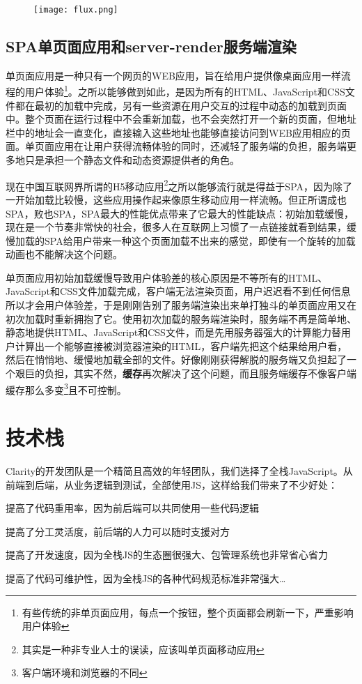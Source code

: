 \begin{figure}[!htp]
 \centering
 \texttt{[image: flux.png]}
\end{figure}

\subsection{SPA单页面应用和server-render服务端渲染}
单页面应用是一种只有一个网页的WEB应用，旨在给用户提供像桌面应用一样流程的用户体验\footnote{有些传统的非单页面应用，每点一个按钮，整个页面都会刷新一下，严重影响用户体验}。之所以能够做到如此，是因为所有的HTML、JavaScript和CSS文件都在最初的加载中完成，另有一些资源在用户交互的过程中动态的加载到页面中。整个页面在运行过程中不会重新加载，也不会突然打开一个新的页面，但地址栏中的地址会一直变化，直接输入这些地址也能够直接访问到WEB应用相应的页面。单页面应用在让用户获得流畅体验的同时，还减轻了服务端的负担，服务端更多地只是承担一个静态文件和动态资源提供者的角色。

现在中国互联网界所谓的H5移动应用\footnote{其实是一种非专业人士的误读，应该叫单页面移动应用}之所以能够流行就是得益于SPA，因为除了一开始加载比较慢，这些应用操作起来像原生移动应用一样流畅。但正所谓成也SPA，败也SPA，SPA最大的性能优点带来了它最大的性能缺点：初始加载缓慢，现在是一个节奏非常快的社会，很多人在互联网上习惯了一点链接就看到结果，缓慢加载的SPA给用户带来一种这个页面加载不出来的感觉，即使有一个旋转的加载动画也不能解决这个问题。

单页面应用初始加载缓慢导致用户体验差的核心原因是不等所有的HTML、JavaScript和CSS文件加载完成，客户端无法渲染页面，用户迟迟看不到任何信息所以才会用户体验差，于是刚刚告别了服务端渲染出来单打独斗的单页面应用又在初次加载时重新拥抱了它。使用初次加载的服务端渲染时，服务端不再是简单地、静态地提供HTML、JavaScript和CSS文件，而是先用服务器强大的计算能力替用户计算出一个能够直接被浏览器渲染的HTML，客户端先把这个结果给用户看，然后在悄悄地、缓慢地加载全部的文件。好像刚刚获得解脱的服务端又负担起了一个艰巨的负担，其实不然，\textbf{缓存}再次解决了这个问题，而且服务端缓存不像客户端缓存那么多变\footnote{客户端环境和浏览器的不同}且不可控制。

\section{技术栈}
Clarity的开发团队是一个精简且高效的年轻团队，我们选择了全栈JavaScript。从前端到后端，从业务逻辑到测试，全部使用JS，这样给我们带来了不少好处：
\begin{enumerate*}
  \item 提高了代码重用率，因为前后端可以共同使用一些代码逻辑
  \item 提高了分工灵活度，前后端的人力可以随时支援对方
  \item 提高了开发速度，因为全栈JS的生态圈很强大、包管理系统也非常省心省力
  \item 提高了代码可维护性，因为全栈JS的各种代码规范标准非常强大\ldots
\end{enumerate*}

